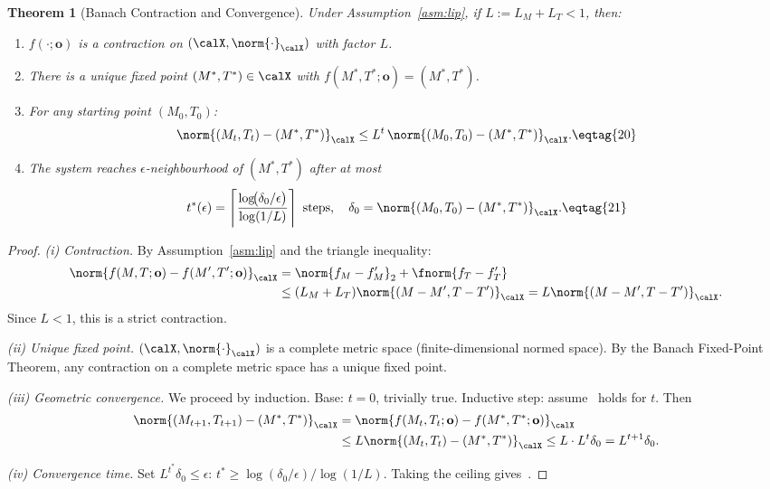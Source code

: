 \documentclass[11pt,letterpaper]{article}
\newtheorem{theorem}{Theorem}[section]
\begin{document}
\begin{theorem}[Banach Contraction and Convergence]\label{thm:banach}
Under Assumption~\ref{asm:lip}, if $L := L_M + L_T < 1$, then:
\begin{enumerate}[label=\emph{(\roman*)},noitemsep]
  \item $f(\cdot;\mathbf{o})$ is a contraction on $(\calX,\norm{\cdot}_\calX)$
        with factor $L$.
  \item There is a unique fixed point $(M^*,T^*) \in \calX$ with
        $f(M^*,T^*;\mathbf{o}) = (M^*,T^*)$.
  \item For any starting point $(M_0,T_0)$:
\[
  \norm{(M_t,T_t)-(M^*,T^*)}_\calX \leq L^t\,\norm{(M_0,T_0)-(M^*,T^*)}_\calX. \eqtag{20}
\]
  \item The system reaches $\epsilon$-neighbourhood of $(M^*,T^*)$ after at most
\[
  t^*(\epsilon) = \left\lceil\frac{\log\!\bigl(\delta_0/\epsilon\bigr)}{\log(1/L)}\right\rceil
  \text{ steps}, \quad \delta_0 = \norm{(M_0,T_0)-(M^*,T^*)}_\calX. \eqtag{21}
\]
\end{enumerate}
\end{theorem}

\begin{proof}
\textit{(i) Contraction.}
By Assumption~\ref{asm:lip} and the triangle inequality:
\begin{align*}
\norm{f(M,T;\mathbf{o}) - f(M',T';\mathbf{o})}_\calX
  &= \norm{f_M - f_M'}_2 + \fnorm{f_T - f_T'}\\
  &\leq (L_M + L_T)\norm{(M-M',T-T')}_\calX = L\norm{(M-M',T-T')}_\calX.
\end{align*}
Since $L < 1$, this is a strict contraction.

\textit{(ii) Unique fixed point.}
$(\calX, \norm{\cdot}_\calX)$ is a complete metric space (finite-dimensional
normed space). By the Banach Fixed-Point Theorem, any contraction on a complete
metric space has a unique fixed point.

\textit{(iii) Geometric convergence.}
We proceed by induction. Base: $t=0$, trivially true.
Inductive step: assume~ holds for $t$. Then
\begin{align*}
\norm{(M_{t+1},T_{t+1}) - (M^*,T^*)}_\calX
  &= \norm{f(M_t,T_t;\mathbf{o}) - f(M^*,T^*;\mathbf{o})}_\calX\\
  &\leq L\norm{(M_t,T_t)-(M^*,T^*)}_\calX
   \leq L\cdot L^t\delta_0 = L^{t+1}\delta_0.
\end{align*}

\textit{(iv) Convergence time.}
Set $L^{t^*}\delta_0 \leq \epsilon$:
$t^* \geq \log(\delta_0/\epsilon)/\log(1/L)$. Taking the ceiling gives~.
\end{proof}
\end{document}
